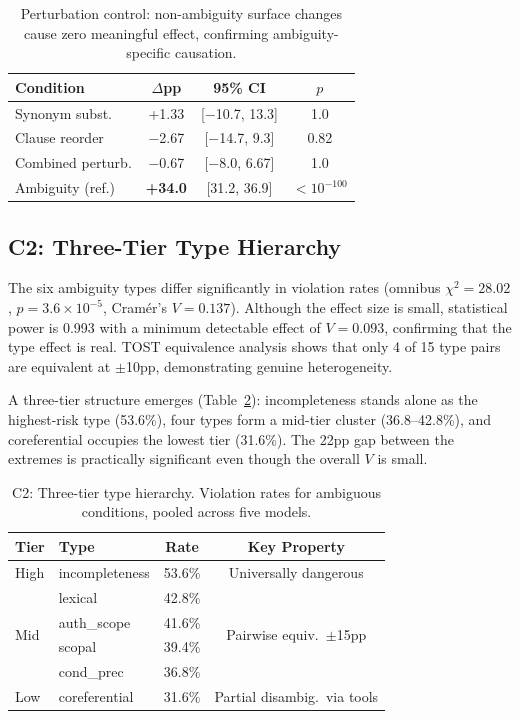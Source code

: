 \documentclass[11pt,a4paper]{article}
\begin{document}
\begin{table}[t]
\centering
\small
\caption{Perturbation control: non-ambiguity surface changes cause zero meaningful effect, confirming ambiguity-specific causation.}
\label{tab:perturb}
\begin{tabular}{lccc}
\toprule
\textbf{Condition} & \textbf{$\Delta$pp} & \textbf{95\% CI} & \textbf{$p$} \\
\midrule
Synonym subst. & +1.33 & [$-$10.7, 13.3] & 1.0 \\
Clause reorder & $-$2.67 & [$-$14.7, 9.3] & 0.82 \\
Combined perturb. & $-$0.67 & [$-$8.0, 6.67] & 1.0 \\
\midrule
Ambiguity (ref.) & \textbf{+34.0} & [31.2, 36.9] & $<10^{-100}$ \\
\bottomrule
\end{tabular}
\end{table}

\subsection{C2: Three-Tier Type Hierarchy}

The six ambiguity types differ significantly in violation rates (omnibus $\chi^2=28.02$, $p=3.6 \times 10^{-5}$, Cram\'{e}r's $V=0.137$). Although the effect size is small, statistical power is 0.993 with a minimum detectable effect of $V=0.093$, confirming that the type effect is real. TOST equivalence analysis shows that only 4 of 15 type pairs are equivalent at $\pm$10pp, demonstrating genuine heterogeneity.

A three-tier structure emerges (Table~\ref{tab:c2}): incompleteness stands alone as the highest-risk type (53.6\%), four types form a mid-tier cluster (36.8--42.8\%), and coreferential occupies the lowest tier (31.6\%). The 22pp gap between the extremes is practically significant even though the overall $V$ is small.

\begin{table}[t]
\centering
\small
\caption{C2: Three-tier type hierarchy. Violation rates for ambiguous conditions, pooled across five models.}
\label{tab:c2}
\begin{tabular}{llcc}
\toprule
\textbf{Tier} & \textbf{Type} & \textbf{Rate} & \textbf{Key Property} \\
\midrule
High & incompleteness & 53.6\% & Universally dangerous \\
\midrule
\multirow{4}{*}{Mid} & lexical & 42.8\% & \multirow{4}{*}{Pairwise equiv.\ $\pm$15pp} \\
 & auth\_scope & 41.6\% & \\
 & scopal & 39.4\% & \\
 & cond\_prec & 36.8\% & \\
\midrule
Low & coreferential & 31.6\% & Partial disambig.\ via tools \\
\bottomrule
\end{tabular}
\end{table}
\end{document}
